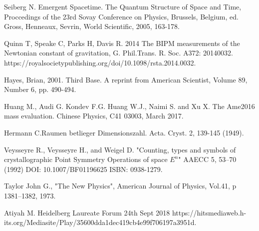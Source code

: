 \documentclass[a4paper,9pt]{article}
\begin{document}
\begin{thebibliography}{99}






 Seiberg N. Emergent Spacetime. The Quantum Structure of Space and Time, Proccedings of the 23rd Sovay Conference on Physics, Brussels, Belgium, ed. Gross, Henneaux, Sevrin, World Scientific, 2005, 163-178.


 Quinn T, Speake C, Parks H, Davis R. 2014 The BIPM measurements of the Newtonian constant of gravitation, G. Phil.Trans. R. Soc. A372: 20140032. https://royalsocietypublishing.org/doi/10.1098/rsta.2014.0032.


 Hayes, Brian, 2001. Third Base. A reprint from American Scientist, Volume 89, Number 6, pp. 490-494. 


 Huang M., Audi G. Kondev F.G. Huang W.J., Naimi S. and Xu X. The Ame2016 mass evaluation. Chinese Physics, C41 03003, March 2017.

 Hermann C.Raumen betlieger Dimensionszahl. Acta. Cryst. 2, 139-145 (1949). 

 Veysseyre R., Veysseyre H., and Weigel D. "Counting, types and symbols of crystallographic Point Symmetry Operations of space $E^{n}$" AAECC 5, 53--70 (1992) DOI: 10.1007/BF01196625 ISBN: 0938-1279.

 Taylor John G., "The New Physics", American Journal of Physics, Vol.41, p 1381--1382, 1973. 

 Atiyah M. Heidelberg Laureate Forum 24th Sept 2018 https://hitsmediaweb.h-its.org/Mediasite/Play/35600dda1dec419cb4e99f706197a3951d.



\end{thebibliography}
\end{document}
